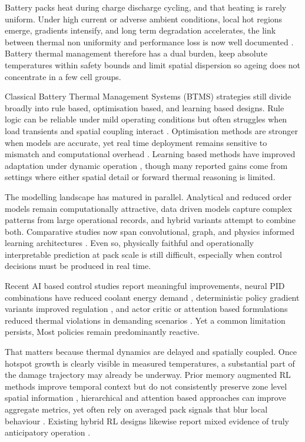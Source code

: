 \documentclass[twocolumn]{article}
\begin{document}
Battery packs heat during charge discharge cycling, and that heating is rarely uniform. Under high current or adverse ambient conditions, local hot regions emerge, gradients intensify, and long term degradation accelerates, the link between thermal non uniformity and performance loss is now well documented \cite{ThermalGradients2023, MultiscaleCoupling2022, AirQuality_EV2023}. Battery thermal management therefore has a dual burden, keep absolute temperatures within safety bounds and limit spatial dispersion so ageing does not concentrate in a few cell groups.

Classical Battery Thermal Management Systems (BTMS) strategies still divide broadly into rule based, optimisation based, and learning based designs. Rule logic can be reliable under mild operating conditions but often struggles when load transients and spatial coupling interact \cite{Xu2019Thermoelectric}. Optimisation methods are stronger when models are accurate, yet real time deployment remains sensitive to mismatch and computational overhead \cite{VPPC2024_MPC, AccessILC2024, TSMC2025}. Learning based methods have improved adaptation under dynamic operation \cite{Huang2022, TVT2025_RLHMPC}, though many reported gains come from settings where either spatial detail or forward thermal reasoning is limited.

The modelling landscape has matured in parallel. Analytical and reduced order models remain computationally attractive, data driven models capture complex patterns from large operational records, and hybrid variants attempt to combine both. Comparative studies now span convolutional, graph, and physics informed learning architectures \cite{AccessMPC2024, AccessILC2024, TSMC2025}. Even so, physically faithful and operationally interpretable prediction at pack scale is still difficult, especially when control decisions must be produced in real time.

Recent AI based control studies report meaningful improvements, neural PID combinations have reduced coolant energy demand \cite{11017253, AccessILC2024}, deterministic policy gradient variants improved regulation \cite{Wu2025}, and actor critic or attention based formulations reduced thermal violations in demanding scenarios \cite{Cao2025, TVT2025_RLHMPC}. Yet a common limitation persists, Most policies remain predominantly reactive.

That matters because thermal dynamics are delayed and spatially coupled. Once hotspot growth is clearly visible in measured temperatures, a substantial part of the damage trajectory may already be underway. Prior memory augmented RL methods improve temporal context but do not consistently preserve zone level spatial information \cite{Huang2022}, hierarchical and attention based approaches can improve aggregate metrics, yet often rely on averaged pack signals that blur local behaviour \cite{Wu2025, Cao2025}. Existing hybrid RL designs likewise report mixed evidence of truly anticipatory operation \cite{TVT2023_Optimal, AccessMPC2024}.
\end{document}
